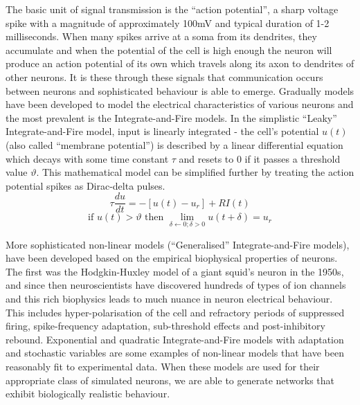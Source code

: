 \documentclass[11pt, twocolumn]{article}
\begin{document}
The basic unit of signal transmission is the ``action potential'', a sharp voltage spike with a magnitude of approximately 100mV and typical duration of 1-2 milliseconds. When many spikes arrive at a soma from its dendrites, they accumulate and when the potential of the cell is high enough the neuron will produce an action potential of its own which travels along its axon to dendrites of other neurons. It is these through these signals that communication occurs between neurons and sophisticated behaviour is able to emerge. Gradually models have been developed to model the electrical characteristics of various neurons and the most prevalent is the Integrate-and-Fire models. In the simplistic ``Leaky'' Integrate-and-Fire model, input is linearly integrated - the cell's potential $u(t)$ (also called ``membrane potential'') is described by a linear differential equation which decays with some time constant $\tau$ and resets to 0 if it passes a threshold value $\vartheta$. This mathematical model can be simplified further by treating the action potential spikes as Dirac-delta pulses.
\begin{equation}
	\tau\frac{du}{dt} = -[u(t)-u_r]+RI(t)
	\label{eqn:leaky_integrate_and_fire_differential}
\end{equation}
\begin{equation}
	\text{if } u(t) > \vartheta \text{ then } \lim\limits_{\delta\leftarrow0;\delta>0}u(t+\delta) = u_r
	\label{eqn:leaky_integrate_and_fire_threshold}
\end{equation}

More sophisticated non-linear models (``Generalised'' Integrate-and-Fire models), have been developed based on the empirical biophysical properties of neurons. The first was the Hodgkin-Huxley model of a giant squid's neuron in the 1950s, and since then neuroscientists have discovered hundreds of types of ion channels and this rich biophysics leads to much nuance in neuron electrical behaviour. This includes hyper-polarisation of the cell and refractory periods of suppressed firing, spike-frequency adaptation, sub-threshold effects and post-inhibitory rebound. Exponential and quadratic Integrate-and-Fire models with adaptation and stochastic variables are some examples of non-linear models that have been reasonably fit to experimental data. When these models are used for their appropriate class of simulated neurons, we are able to generate networks that exhibit biologically realistic behaviour. 
\end{document}
